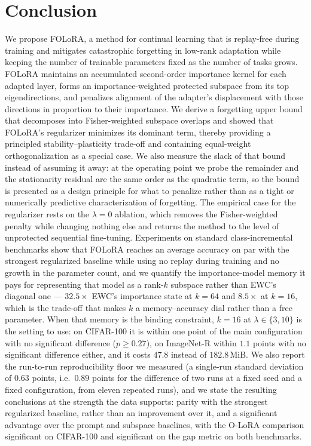 \section{Conclusion}
\label{sec:conclusion}

We propose FOLoRA, a method for continual learning that is replay-free during training and mitigates catastrophic
forgetting in low-rank adaptation while keeping the number of trainable parameters fixed
as the number of tasks grows. FOLoRA maintains an accumulated
second-order importance kernel for each adapted layer, forms an importance-weighted
protected subspace from its top eigendirections, and penalizes alignment of the adapter's
displacement with those directions in proportion to their importance. We derive a
forgetting upper bound that decomposes into Fisher-weighted subspace overlaps and showed
that FOLoRA's regularizer minimizes its dominant term, thereby providing a principled
stability--plasticity trade-off and containing equal-weight orthogonalization as a special
case. We also measure the slack of that bound instead of assuming it away: at the
operating point we probe the remainder and the stationarity residual are the same order as
the quadratic term, so the bound is presented as a design principle for what to penalize
rather than as a tight or numerically predictive characterization of forgetting. The
empirical case for the regularizer rests on the $\lambda{=}0$ ablation, which removes the
Fisher-weighted penalty while changing nothing else and returns the method to the level of
unprotected sequential fine-tuning. Experiments on standard class-incremental benchmarks show that FOLoRA reaches an
average accuracy on par with the strongest regularized baseline while using no replay during
training and no growth in the parameter count, and we quantify the importance-model memory
it pays for representing that model as a rank-$k$ subspace rather than EWC's diagonal one
--- $32.5\times$ EWC's importance state at $k{=}64$ and $8.5\times$ at $k{=}16$, which is the
trade-off that makes $k$ a memory--accuracy dial rather than a free parameter. When that memory
is the binding constraint, $k{=}16$ at $\lambda\in\{3,10\}$ is the setting to use: on CIFAR-100
it is within one point of the main configuration with no significant difference ($p\ge0.27$),
on ImageNet-R within $1.1$ points with no significant difference either, and it costs $47.8$
instead of $182.8$\,MiB. We also
report the run-to-run reproducibility floor we measured (a single-run standard deviation of
$0.63$ points, i.e.\ $0.89$ points for the difference of two runs at a fixed seed and a
fixed configuration, from eleven repeated runs), and we state the resulting conclusions at the strength the data
supports: parity with the strongest regularized baseline, rather than an improvement over
it, and a significant advantage over the prompt and subspace baselines, with the O-LoRA
comparison significant on CIFAR-100 and significant on the gap metric on both benchmarks.

